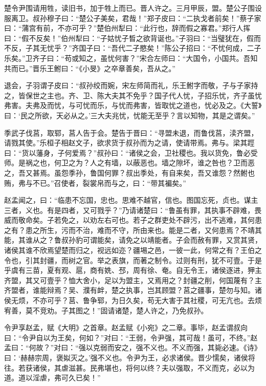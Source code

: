 \documentclass[a4paper,12pt,UTF8,twoside]{ctexbook}
\begin{document}
楚令尹围请用牲，读旧书，加于牲上而已。晋人许之。三月甲辰，盟。楚公子围设服离卫。叔孙穆子曰：“楚公子美矣，君哉！”郑子皮曰：“二执戈者前矣！”蔡子家曰：“蒲宫有前，不亦可乎？”楚伯州犁曰：“此行也，辞而假之寡君。”郑行人挥曰：“假不反矣！”伯州犁曰：“子姑忧子晳之欲背诞也。”子羽曰：“当璧犹在，假而不反，子其无忧乎？”齐国子曰：“吾代二子愍矣！”陈公子招曰：“不忧何成，二子乐矣。”卫齐子曰：“苟或知之，虽忧何害？”宋合左师曰：“大国令，小国共。吾知共而已。”晋乐王鲋曰：“《小旻》之卒章善矣，吾从之。”

退会，子羽谓子皮曰：“叔孙绞而婉，宋左师简而礼，乐王鲋字而敬，子与子家持之，皆保世之主也。齐、卫、陈大夫其不免乎？国子代人忧，子招乐忧，齐子虽忧弗害。夫弗及而忧，与可忧而乐，与忧而弗害，皆取忧之道也，忧必及之。《大誓》曰：‘民之所欲，天必从之。’三大夫兆忧，忧能无至乎？言以知物，其是之谓矣。”

季武子伐莒，取郓，莒人告于会。楚告于晋曰：“寻盟未退，而鲁伐莒，渎齐盟，请戮其使。”乐桓子相赵文子，欲求货于叔孙而为之请，使请带焉。弗与。梁其踁曰：“货以藩身，子何爱焉？”叔孙曰：“诸侯之会，卫社稷也。我以货免，鲁必受师。是祸之也，何卫之为？人之有墙，以蔽恶也。墙之隙坏，谁之咎也？卫而恶之，吾又甚焉。虽怨季孙，鲁国何罪？叔出季处，有自来矣，吾又谁怨？然鲋也贿，弗与不已。”召使者，裂裳帛而与之，曰：“带其褊矣。”

赵孟闻之，曰：“临患不忘国，忠也。思难不越官，信也。图国忘死，贞也。谋主三者，义也。有是四者，又可戮乎？”乃请诸楚曰：“鲁虽有罪，其执事不辟难，畏威而敬命矣。子若免之，以劝左右可也。若子之群吏处不辟污，出不逃难，其何患之有？患之所生，污而不治，难而不守，所由来也。能是二者，又何患焉？不靖其能，其谁从之？鲁叔孙豹可谓能矣，请免之以靖能者。子会而赦有罪，又赏其贤，诸侯其谁不欣焉望楚而归之，视远如迩？疆埸之邑，一彼一此，何常之有？王伯之令也，引其封疆，而树之官。举之表旗，而著之制令。过则有刑，犹不可壹。于是乎虞有三苗，夏有观、扈，商有姺、邳，周有徐、奄。自无令王，诸侯逐进，狎主齐盟，其又可壹乎？恤大舍小，足以为盟主，又焉用之？封疆之削，何国蔑有？主齐盟者，谁能辩焉？吴、濮有衅，楚之执事，岂其顾盟？莒之疆事，楚勿与知。诸侯无烦，不亦可乎？莒、鲁争郓，为日久矣，苟无大害于其社稷，可无亢也。去烦宥善，莫不竞劝。子其图之！”固请诸楚，楚人许之，乃免叔孙。

令尹享赵孟，赋《大明》之首章。赵孟赋《小宛》之二章。事毕，赵孟谓叔向曰：“令尹自以为王矣，何如？”对曰：“王弱，令尹强，其可哉！虽可，不终。”赵孟曰：“何故？”对曰：“强以克弱而安之，强不义也。不义而强，其毙必速。《诗》曰：‘赫赫宗周，褒姒灭之。’强不义也。令尹为王，必求诸侯。晋少懦矣，诸侯将往。若获诸侯，其虐滋甚。民弗堪也，将何以终？夫以强取，不义而克，必以为道。道以淫虐，弗可久已矣！”
\end{document}
